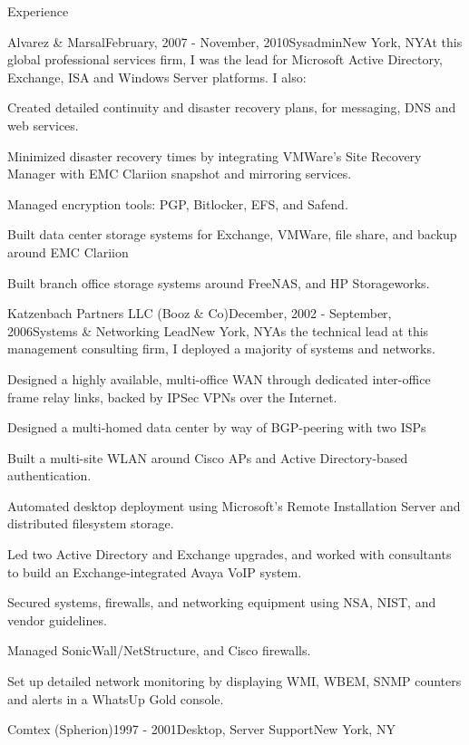 \documentclass{resume} %
\begin{document}
\begin{rSection}{Experience}
\begin{rSubsection}{Alvarez \& Marsal}{February, 2007 - November, 2010}{Sysadmin}{New York, NY}{At this global professional services firm, I was the lead for Microsoft Active Directory, Exchange, ISA and Windows Server platforms. I also:}
\item Created detailed continuity and disaster recovery plans, for messaging, DNS and web services.
\item Minimized disaster recovery times by integrating VMWare's Site Recovery Manager with EMC Clariion snapshot and mirroring services.
\item Managed encryption tools: PGP, Bitlocker, EFS, and Safend.
\item Built data center storage systems for Exchange, VMWare, file share, and backup around EMC Clariion
\item Built branch office storage systems around FreeNAS, and HP Storageworks.
\end{rSubsection}

\pagebreak
\begin{rSubsection}{Katzenbach Partners LLC (Booz \& Co)}{December, 2002 - September, 2006}{Systems \& Networking Lead}{New York, NY}{As the technical lead at this management consulting firm, I deployed a majority of systems and networks.}
\item Designed a highly available, multi-office WAN through dedicated inter-office frame relay links, backed by IPSec VPNs over the Internet.
\item Designed a multi-homed data center by way of BGP-peering with two ISPs  
\item Built a multi-site WLAN around Cisco APs and Active Directory-based authentication.
\item Automated desktop deployment using Microsoft's Remote Installation Server and distributed filesystem storage.
\item Led two Active Directory and Exchange upgrades, and worked with consultants to build an Exchange-integrated Avaya VoIP system.
\item Secured systems, firewalls, and networking equipment using NSA, NIST, and vendor guidelines.
\item Managed SonicWall/NetStructure, and Cisco firewalls. 
\item Set up detailed network monitoring by displaying WMI, WBEM, SNMP counters and alerts in a WhatsUp Gold console.
\end{rSubsection}

\begin{rSubsection}{Comtex (Spherion)}{1997 - 2001}{Desktop, Server Support}{New York, NY}
\item 
\end{rSubsection}
\end{rSection}
\end{document}
